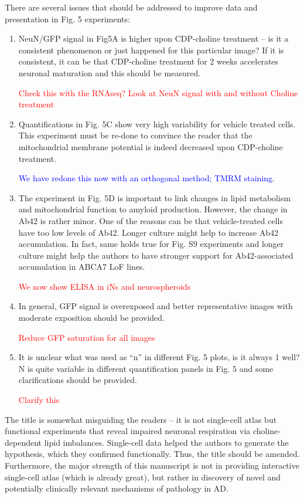 There are several issues that should be addressed to improve data and presentation in Fig. 5 experiments:
\begin{enumerate}
	\item NeuN/GFP signal in Fig5A is higher upon CDP-choline treatment – is it a consistent phenomenon or just happened for this particular image? If it is consistent, it can be that CDP-choline treatment for 2 weeks accelerates neuronal maturation and this should be measured.

	\textcolor{red}{Check this with the RNAseq?}
	\textcolor{red}{Look at NeuN signal with and without Choline treatment}

	\item Quantifications in Fig. 5C show very high variability for vehicle treated cells. This experiment must be re-done to convince the reader that the mitochondrial membrane potential is indeed decreased upon CDP-choline treatment.
	
	\textcolor{blue}{We have redone this now with an orthogonal method; TMRM staining}.

	\item The experiment in Fig. 5D is important to link changes in lipid metabolism and mitochondrial function to amyloid production. However, the change in Ab42 is rather minor. One of the reasons can be that vehicle-treated cells have too low levels of Ab42. Longer culture might help to increase Ab42 accumulation. In fact, same holds true for Fig. S9 experiments and longer culture might help the authors to have stronger support for Ab42-associated accumulation in ABCA7 LoF lines.
	
	\textcolor{red}{We now show ELISA in iNs and neurospheroids}

	\item In general, GFP signal is overexposed and better representative images with moderate exposition should be provided.
	
	\textcolor{red}{Reduce GFP saturation for all images} 

	\item It is unclear what was used as “n” in different Fig. 5 plots, is it always 1 well? N is quite variable in different quantification panels in Fig. 5 and some clarifications should be provided.
	
	\textcolor{red}{Clarify this}

\end{enumerate}

The title is somewhat misguiding the readers – it is not single-cell atlas but functional experiments that reveal impaired neuronal respiration via choline-dependent lipid imbalances. Single-cell data helped the authors to generate the hypothesis, which they confirmed functionally. Thus, the title should be amended. Furthermore, the major strength of this manuscript is not in providing interactive single-cell atlas (which is already great), but rather in discovery of novel and potentially clinically relevant mechanisms of pathology in AD.

